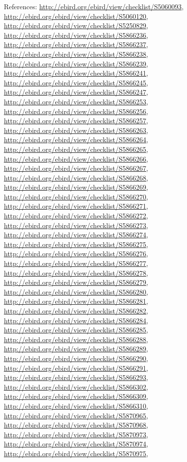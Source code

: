 \documentclass[9pt, article]{memoir}
\begin{document}
\begin{multicols}{2}
References: 
\url{http://ebird.org/ebird/view/checklist/S5060093}, 
\url{http://ebird.org/ebird/view/checklist/S5060120}, 
\url{http://ebird.org/ebird/view/checklist/S5250829}, 
\url{http://ebird.org/ebird/view/checklist/S5866236}, 
\url{http://ebird.org/ebird/view/checklist/S5866237}, 
\url{http://ebird.org/ebird/view/checklist/S5866238}, 
\url{http://ebird.org/ebird/view/checklist/S5866239}, 
\url{http://ebird.org/ebird/view/checklist/S5866241}, 
\url{http://ebird.org/ebird/view/checklist/S5866245}, 
\url{http://ebird.org/ebird/view/checklist/S5866247}, 
\url{http://ebird.org/ebird/view/checklist/S5866253}, 
\url{http://ebird.org/ebird/view/checklist/S5866256}, 
\url{http://ebird.org/ebird/view/checklist/S5866257}, 
\url{http://ebird.org/ebird/view/checklist/S5866263}, 
\url{http://ebird.org/ebird/view/checklist/S5866264}, 
\url{http://ebird.org/ebird/view/checklist/S5866265}, 
\url{http://ebird.org/ebird/view/checklist/S5866266}, 
\url{http://ebird.org/ebird/view/checklist/S5866267}, 
\url{http://ebird.org/ebird/view/checklist/S5866268}, 
\url{http://ebird.org/ebird/view/checklist/S5866269}, 
\url{http://ebird.org/ebird/view/checklist/S5866270}, 
\url{http://ebird.org/ebird/view/checklist/S5866271}, 
\url{http://ebird.org/ebird/view/checklist/S5866272}, 
\url{http://ebird.org/ebird/view/checklist/S5866273}, 
\url{http://ebird.org/ebird/view/checklist/S5866274}, 
\url{http://ebird.org/ebird/view/checklist/S5866275}, 
\url{http://ebird.org/ebird/view/checklist/S5866276}, 
\url{http://ebird.org/ebird/view/checklist/S5866277}, 
\url{http://ebird.org/ebird/view/checklist/S5866278}, 
\url{http://ebird.org/ebird/view/checklist/S5866279}, 
\url{http://ebird.org/ebird/view/checklist/S5866280}, 
\url{http://ebird.org/ebird/view/checklist/S5866281}, 
\url{http://ebird.org/ebird/view/checklist/S5866282}, 
\url{http://ebird.org/ebird/view/checklist/S5866284}, 
\url{http://ebird.org/ebird/view/checklist/S5866285}, 
\url{http://ebird.org/ebird/view/checklist/S5866288}, 
\url{http://ebird.org/ebird/view/checklist/S5866289}, 
\url{http://ebird.org/ebird/view/checklist/S5866290}, 
\url{http://ebird.org/ebird/view/checklist/S5866291}, 
\url{http://ebird.org/ebird/view/checklist/S5866293}, 
\url{http://ebird.org/ebird/view/checklist/S5866302}, 
\url{http://ebird.org/ebird/view/checklist/S5866309}, 
\url{http://ebird.org/ebird/view/checklist/S5866310}, 
\url{http://ebird.org/ebird/view/checklist/S5870965}, 
\url{http://ebird.org/ebird/view/checklist/S5870968}, 
\url{http://ebird.org/ebird/view/checklist/S5870973}, 
\url{http://ebird.org/ebird/view/checklist/S5870974}, 
\url{http://ebird.org/ebird/view/checklist/S5870975}, 

\end{multicols}
\end{document}
